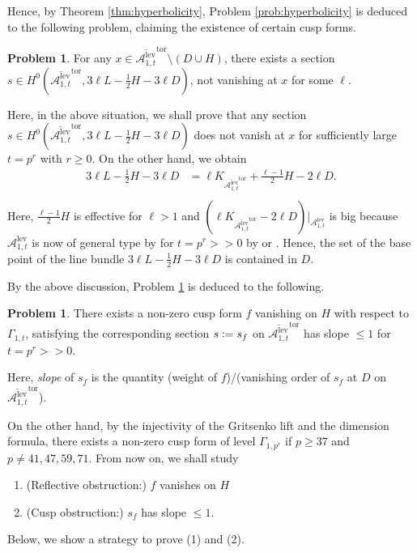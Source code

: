 \documentclass[12pt, pdftex]{amsart}
\theoremstyle{plain}
\theoremstyle{definition}
\newtheorem{prob}[thm]{Problem}
\numberwithin{equation}{section}
\def\A{{\mathbb A}}
\def\tor{\mathrm{tor}}
\def\lev{\mathrm{lev}}
\def\A{\mathcal{A}}
\newcommand{\defeq}{\vcentcolon=}
\begin{document}
Hence, by Theorem \ref{thm:hyperbolicity}, Problem \ref{prob:hyperbolicity} is deduced to the following problem, claiming the existence of certain cusp forms.
\begin{prob}
\label{prob:cusp_form}
For any $x\in \overline{\A^{\lev}_{1,t}}^{\tor}\setminus (D\cup H)$, there exists a section $s\in H^0(\overline{\A^{\lev}_{1,t}}^{\tor}, 3\ell L-\frac{1}{2}H-3\ell D)$, not vanishing at $x$ for some $\ell$.
\end{prob}
Here, in the above situation, we shall prove that any section $s\in H^0(\overline{\A^{\lev}_{1,t}}^{\tor}, 3\ell L-\frac{1}{2}H-3\ell D)$ does not vanish at $x$ for sufficiently large $t=p^r$ with $r\geq 0$.
On the other hand, we obtain 
\begin{align*}
3\ell L-\frac{1}{2}H-3\ell D&=\ell K_{\overline{\A^{\lev}_{1,t}}^{\tor}}+\frac{\ell-1}{2}H-2\ell D.\\
\end{align*}
Here, $\frac{\ell-1}{2}H$ is effective for $\ell>1$ and $(\ell K_{\overline{\A^{\lev}_{1,t}}^{\tor}}-2\ell D)\vert_{\A^{\lev}_{1,t}}$ is big because $\A^{\lev}_{1,t}$ is now of general type by for $t=p^r>>0$ by \cite{Erd04, GS96, OG89, San97} or \cite[section 2]{HS94}.
Hence, the set of the base point of the line bundle $3\ell L-\frac{1}{2}H-3\ell D$ is contained in $D$.

By the above discussion, Problem \ref{prob:cusp_form} is deduced to the following.
\begin{prob}
There exists a non-zero cusp form $f$ vanishing on $H$ with respect to $\Gamma_{1,t}$, satisfying the corresponding section $s\defeq s_f$ on $\overline{\A^{\lev}_{1,t}}^{\tor}$ has slope $\leq 1$ for $t=p^r>>0$.
\end{prob}
Here, \textit{slope} of $s_f$ is the quantity (weight of $f$)/(vanishing order of $s_f$ at $D$ on $\overline{\A^{\lev}_{1,t}}^{\tor}$).

On the other hand, by the injectivity of the Gritsenko lift and the dimension formula, there exists a non-zero cusp form of level $\Gamma_{1,p^r}$ if $p\geq 37$ and $p\neq 41,47,59,71$.
From now on, we shall study 
\begin{enumerate}
\item (Reflective obstruction:) $f$ vanishes on $H$
\item (Cusp obstruction:) $s_f$ has slope $\leq 1$.
\end{enumerate}



Below, we show a strategy to prove (1) and (2).
\end{document}

